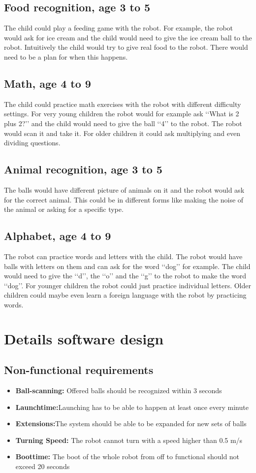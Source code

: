 \documentclass[11pt,twoside,a4paper]{report}
\begin{document}
\begin{appendices}
\section*{Food recognition, age 3 to 5}
The child could play a feeding game with the robot. For example, the robot would ask for ice cream and the child would need to give the ice cream ball to the robot. Intuitively the child would try to give real food to the robot. There would need to be a plan for when this happens.
\section*{Math, age 4 to 9}
The child could practice math exercises with the robot with different difficulty settings. For very young children the robot would for example ask \lq\lq{}What is 2 plus 2?\rq\rq{} and the child would need to give the ball \lq\lq{}4\rq\rq{} to the robot. The robot would scan it and take it. For older children it could ask multiplying and even dividing questions.
\section*{Animal recognition, age 3 to 5}
The balls would have different picture of animals on it and the robot would ask for the correct animal. This could be in different forms like making the noise of the animal or asking for a specific type.
\section*{Alphabet, age 4 to 9}
The robot can practice words and letters with the child. The robot would have balls with letters on them and can ask for the word \lq\lq{}dog\rq\rq{} for example. The child would need to give the \lq\lq{}d\rq\rq{}, the \lq\lq{}o\rq\rq{} and the \lq\lq{}g\rq\rq{} to the robot to make the word \lq\lq{}dog\rq\rq{}. For younger children the robot could just practice individual letters. Older children could maybe even learn a foreign language with the robot by practicing words.
\label{appendix:games}

\chapter{Details software design}
\section{Non-functional requirements}
\begin{itemize}
\item \textbf{Ball-scanning:} Offered balls should be recognized within 3 seconds
\item\textbf{Launchtime:}Launching has to be able to happen at least once every minute
\item\textbf{Extensions:}The system should be able to be expanded for new sets of balls
\item\textbf{Turning Speed:} The robot cannot turn with a speed higher than 0.5 m/s
\item\textbf{Boottime:} The boot of the whole robot from off to functional should not exceed 20 seconds
\end{itemize}


\end{appendices}
\end{document}
